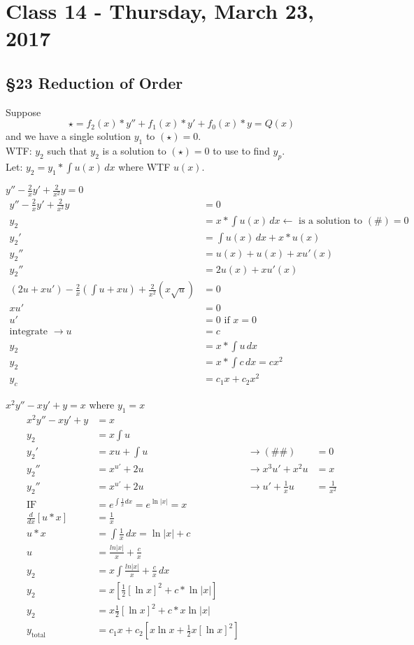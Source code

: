 \chapter{Class 14 - Thursday, March 23, 2017}
\section*{\S 23 Reduction of Order}
Suppose $$ \star = f_2(x)*y''+f_1(x)*y'+f_0(x)*y=Q(x)$$ and we have a single solution $y_1$ to $( \star )=0$.\\
WTF: $y_2$ such that $y_2$ is a solution to $( \star )=0$ to use to find $y_p$.\\
Let: $y_2=y_1*\int u(x) \,dx $ where WTF $u(x)$.\\
\begin{ex}
$y''-\frac{2}{x}y'+ \frac{2}{x^2}y=0$
\begin{align*}
    y''-\frac{2}{x}y'+ \frac{2}{x^2}y&=0\\
    y_2&= x*\int u(x) \,dx \leftarrow \text{ is a solution to } ( \# )=0\\
    y_2'&=\int u(x) \,dx + x*u(x)\\
    y_2''&= u(x)+u(x)+xu'(x)\\
    y_2''&= 2u(x)+xu'(x)\\
    \left( 2u+xu' \right) -\frac{2}{x} \left( \int u +xu \right) +\frac{2}{x^2} \left( x\sqrt{u} \right) &=0\\
    xu'&=0\\
    u'&=0 \text{ if } x=0\\
    \text{integrate }\rightarrow u&=c\\
    y_2&=x*\int u \,dx\\
    y_2&=x*\int c \,dx = cx^2\\
    y_c&= c_1x+c_2x^2
\end{align*}
\end{ex}
\begin{ex}
$x^2y''-xy'+y=x$ where $y_1=x$
\begin{align*}
    x^2y''-xy'+y&=x\\
    y_2&=x\int u\\
    y_2'&=xu+\int u &\rightarrow (\# \# )&=0\\
    y_2''&=x^{u'}+2u &\rightarrow x^3u'+x^2u&=x\\
    y_2''&=x^{u'}+2u &\rightarrow u'+\frac{1}{x}u &= \frac{1}{x^2}\\
    \text{IF}&=e^{\int \frac{1}{x}dx}=e^{\ln |x|}=x\\
    \frac{d}{dx}[u*x]&=\frac{1}{x}\\
    u*x&=\int \frac{1}{x} \,dx = \ln |x| +c\\
    u&=\frac{ln|x|}{x}+\frac{c}{x}\\
    y_2&= x\int \frac{ln|x|}{x}+\frac{c}{x} \,dx\\
    y_2&= x\left[ \frac{1}{2} [\ln x]^2 +c*\ln |x| \right]\\
    y_2&= x \frac{1}{2} [\ln x]^2 +c*x \ln |x|\\
    y_{\text{total}}&= c_1x+c_2\left[ x \ln x + \frac{1}{2}x [\ln x]^2 \right]
\end{align*}
\end{ex}
